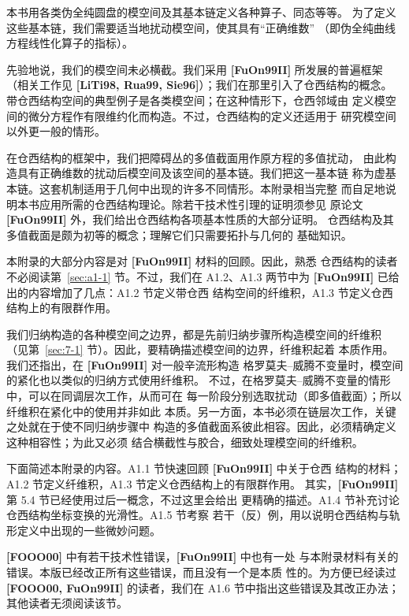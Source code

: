 
本书用各类伪全纯圆盘的模空间及其基本链定义各种算子、同态等等。
为了定义这些基本链，我们需要适当地扰动模空间，使其具有“正确维数”
（即伪全纯曲线方程线性化算子的指标）。

先验地说，我们的模空间未必横截。我们采用 
\textbf{[FuOn99II]} 所发展的普遍框架（相关工作见
\textbf{[LiTi98, Rua99, Sie96]}）；我们在那里引入了仓西结构的概念。
带仓西结构空间的典型例子是各类模空间；在这种情形下，仓西邻域由
定义模空间的微分方程作有限维约化而构造。不过，仓西结构的定义还适用于
研究模空间以外更一般的情形。

在仓西结构的框架中，我们把障碍丛的多值截面用作原方程的多值扰动，
由此构造具有正确维数的扰动后模空间及该空间的基本链。我们把这一基本链
称为虚基本链。这套机制适用于几何中出现的许多不同情形。本附录相当完整
而自足地说明本书应用所需的仓西结构理论。除若干技术性引理的证明须参见
原论文 \textbf{[FuOn99II]} 外，我们给出仓西结构各项基本性质的大部分证明。
仓西结构及其多值截面是颇为初等的概念；理解它们只需要拓扑与几何的
基础知识。

本附录的大部分内容是对 \textbf{[FuOn99II]} 材料的回顾。因此，熟悉
仓西结构的读者不必阅读第~\ref{sec:a1-1} 节。不过，我们在 A1.2、A1.3
两节中为 \textbf{[FuOn99II]} 已给出的内容增加了几点：A1.2 节定义带仓西
结构空间的纤维积，A1.3 节定义仓西结构上的有限群作用。

我们归纳构造的各种模空间之边界，都是先前归纳步骤所构造模空间的纤维积
（见第~\ref{sec:7-1} 节）。因此，要精确描述模空间的边界，纤维积起着
本质作用。我们还指出，在 \textbf{[FuOn99II]} 对一般辛流形构造
格罗莫夫--威腾不变量时，模空间的紧化也以类似的归纳方式使用纤维积。
不过，在格罗莫夫--威腾不变量的情形中，可以在同调层次工作，从而可在
每一阶段分别选取扰动（即多值截面）；所以纤维积在紧化中的使用并非如此
本质。另一方面，本书必须在链层次工作，关键之处就在于使不同归纳步骤中
构造的多值截面系彼此相容。因此，必须精确定义这种相容性；为此又必须
结合横截性与胶合，细致处理模空间的纤维积。

下面简述本附录的内容。A1.1 节快速回顾 \textbf{[FuOn99II]} 中关于仓西
结构的材料；A1.2 节定义纤维积，A1.3 节定义仓西结构上的有限群作用。
其实，\textbf{[FuOn99II]} 第 5.4 节已经使用过后一概念，不过这里会给出
更精确的描述。A1.4 节补充讨论仓西结构坐标变换的光滑性。A1.5 节考察
若干（反）例，用以说明仓西结构与轨形定义中出现的一些微妙问题。

\textbf{[FOOO00]} 中有若干技术性错误，\textbf{[FuOn99II]} 中也有一处
与本附录材料有关的错误。本版已经改正所有这些错误，而且没有一个是本质
性的。为方便已经读过 \textbf{[FOOO00, FuOn99II]} 的读者，我们在 A1.6
节中指出这些错误及其改正办法；其他读者无须阅读该节。

